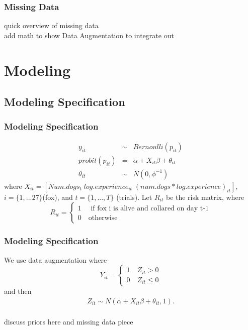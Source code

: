 \documentclass{beamer}
\begin{document}
\begin{frame}
	\frametitle{Missing Data}
	quick overview of missing data \\
	add math to show Data Augmentation to integrate out
	\end{frame}
\section{Modeling}
\subsection{Modeling Specification}
\begin{frame}
	\frametitle{Modeling Specification}
\begin{eqnarray}
y_{it} &\sim& Bernoulli(p_{it}) \\
probit(p_{it}) & = & \alpha + X_{it}\beta+ \theta_{it} \\
\theta_{it} &\sim& N(0, \phi^{-1})
\end{eqnarray}
where $X_{it} = [Num.dogs_t\; log.experience_{it}\; (num.dogs*log.experience)_{it}],$ $i = \{1,...27\} $(fox), and $t= \{1,...,T\}$ (trials). Let $R_{it}$ be the risk matrix, where
\[
    R_{it}=\left\{
                \begin{array}{ll}
                  1 \quad \text{ if fox i is alive and collared on day t-1}\\
                  0 \quad \text{otherwise}
                \end{array}
              \right.
  \]
 \end{frame}
\begin{frame}
	\frametitle{Modeling Specification}
	 We use data augmentation where 
	 \[
    Y_{it}=\left\{
                \begin{array}{ll}
                  1 \quad  Z_{it} > 0\\
                  0 \quad Z_{it} \leq 0
                \end{array}
              \right.
  \]
and then
  \begin{eqnarray}
  Z_{it} \sim N( \alpha + X_{it}\beta +\theta_{it},1).
  \end{eqnarray}
\\
	discuss priors here and missing data piece
\end{frame}
\end{document}
